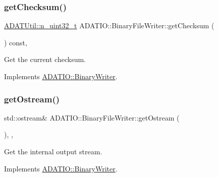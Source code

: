 \subsubsection{\texorpdfstring{getChecksum()}{getChecksum()}\hspace{0.1cm}{\footnotesize\ttfamily [2/2]}}
{\footnotesize\ttfamily \mbox{\hyperlink{namespaceADATUtil_ad945a8afa4db2d1f89b731964adae97e}{A\+D\+A\+T\+Util\+::n\+\_\+uint32\+\_\+t}} A\+D\+A\+T\+I\+O\+::\+Binary\+File\+Writer\+::get\+Checksum (\begin{DoxyParamCaption}{ }\end{DoxyParamCaption}) const\hspace{0.3cm}{\ttfamily [inline]}, {\ttfamily [virtual]}}



Get the current checksum. 



Implements \mbox{\hyperlink{classADATIO_1_1BinaryWriter_a8bebb70a7248b14c8a4dcf7aa49c1503}{A\+D\+A\+T\+I\+O\+::\+Binary\+Writer}}.

\mbox{\label{classADATIO_1_1BinaryFileWriter_a2506200a774d4823088a0365e0452d9a}} 
\subsubsection{\texorpdfstring{getOstream()}{getOstream()}\hspace{0.1cm}{\footnotesize\ttfamily [1/2]}}
{\footnotesize\ttfamily std\+::ostream\& A\+D\+A\+T\+I\+O\+::\+Binary\+File\+Writer\+::get\+Ostream (\begin{DoxyParamCaption}{ }\end{DoxyParamCaption})\hspace{0.3cm}{\ttfamily [inline]}, {\ttfamily [protected]}, {\ttfamily [virtual]}}



Get the internal output stream. 



Implements \mbox{\hyperlink{classADATIO_1_1BinaryWriter_a4fe227341d17d012bb83a070c208dac0}{A\+D\+A\+T\+I\+O\+::\+Binary\+Writer}}.

\mbox{\label{classADATIO_1_1BinaryFileWriter_a2506200a774d4823088a0365e0452d9a}} 
